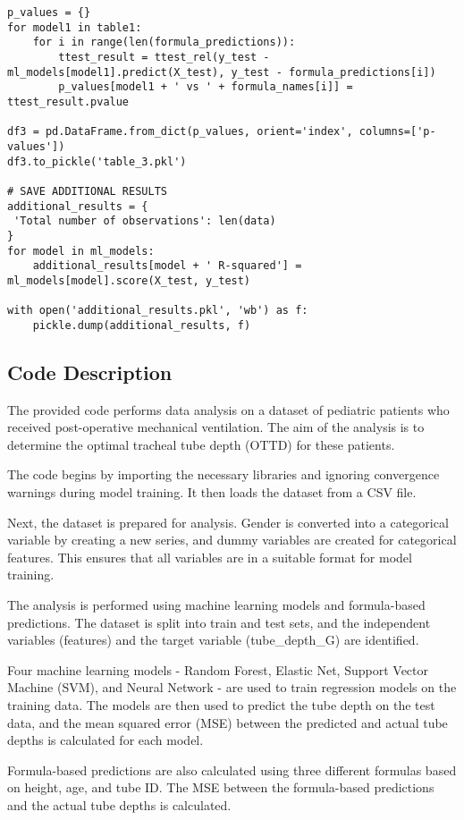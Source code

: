 \documentclass[11pt]{article}
\begin{document}
\begin{verbatim}
p_values = {}
for model1 in table1:
    for i in range(len(formula_predictions)):
        ttest_result = ttest_rel(y_test - ml_models[model1].predict(X_test), y_test - formula_predictions[i])
        p_values[model1 + ' vs ' + formula_names[i]] = ttest_result.pvalue

df3 = pd.DataFrame.from_dict(p_values, orient='index', columns=['p-values'])
df3.to_pickle('table_3.pkl')

# SAVE ADDITIONAL RESULTS
additional_results = {
 'Total number of observations': len(data)
}
for model in ml_models:
    additional_results[model + ' R-squared'] = ml_models[model].score(X_test, y_test)

with open('additional_results.pkl', 'wb') as f:
    pickle.dump(additional_results, f)

\end{verbatim}

\subsection{Code Description}

The provided code performs data analysis on a dataset of pediatric patients who received post-operative mechanical ventilation. The aim of the analysis is to determine the optimal tracheal tube depth (OTTD) for these patients.

The code begins by importing the necessary libraries and ignoring convergence warnings during model training. It then loads the dataset from a CSV file.

Next, the dataset is prepared for analysis. Gender is converted into a categorical variable by creating a new series, and dummy variables are created for categorical features. This ensures that all variables are in a suitable format for model training.

The analysis is performed using machine learning models and formula-based predictions. The dataset is split into train and test sets, and the independent variables (features) and the target variable (tube\_depth\_G) are identified. 

Four machine learning models - Random Forest, Elastic Net, Support Vector Machine (SVM), and Neural Network - are used to train regression models on the training data. The models are then used to predict the tube depth on the test data, and the mean squared error (MSE) between the predicted and actual tube depths is calculated for each model.

Formula-based predictions are also calculated using three different formulas based on height, age, and tube ID. The MSE between the formula-based predictions and the actual tube depths is calculated.
\end{document}
